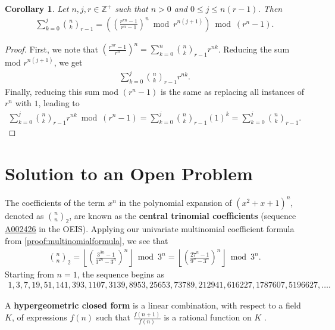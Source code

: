 \documentclass[10pt,a4paper]{article}
\theoremstyle{plain}
\newtheorem{corollary}{Corollary}[section]
\newcommand{\floor}[1]{\left\lfloor #1 \right\rfloor}
\newcommand{\seqnum}[1]{\href{https://oeis.org/#1}{\rm \underline{#1}}}
\begin{document}
\begin{corollary} \label{proof:multinomialcoeffpartialsums}
Let $n,j,r \in \mathbb{Z}^+$ such that $n > 0$ and $0 \leq j \leq n (r-1)$. Then
\begin{align*}
\sum_{k=0}^{j} \binom{n}{k}_{r-1}
= \left( \left( \frac{r^{rn}-1}{r^n-1} \right)^n \bmod r^{n(j+1)} \right) \bmod (r^n-1) .
\end{align*}
\end{corollary}
\begin{proof}
First, we note that $\left(\frac{r^{nr}-1}{r^n}\right)^n = \sum_{k=0}^n \binom{n}{k}_{r-1} r^{nk}$. Reducing the sum mod $r^{n(j+1)}$, we get
\begin{align*}
    \sum_{k=0}^{j} \binom{n}{k}_{r-1} r^{nk} .
\end{align*}
Finally, reducing this sum mod $(r^n-1)$ is the same as replacing all instances of $r^n$ with $1$, leading to
\begin{align*}
    \sum_{k=0}^{j} \binom{n}{k}_{r-1} r^{nk} \bmod (r^n-1)
    = \sum_{k=0}^{j} \binom{n}{k}_{r-1} (1)^{k}
    = \sum_{k=0}^{j} \binom{n}{k}_{r-1} .
\end{align*}
\end{proof}

\section{Solution to an Open Problem} \label{section:centraltrinomialcoefficients}
The coefficients of the term $x^n$ in the polynomial expansion of $(x^2+x+1)^n$, denoted as $\binom{n}{n}_2$, are known as the \textbf{central trinomial coefficients} (sequence \seqnum{A002426} in the OEIS). Applying our univariate multinomial coefficient formula from \cref{proof:multinomialformula}, we see that
\begin{align*}
    \binom{n}{n}_2 = \floor{\left(\frac{3^{3n} - 1}{3^{2n} - 3^n}\right)^n} \bmod 3^n
    = \floor{\left(\frac{27^n - 1}{9^n - 3^n}\right)^n} \bmod 3^n .
\end{align*}
Starting from $n=1$, the sequence begins as
\begin{align*}
1,3,7,19,51,141,393,1107,3139,8953,25653,73789,212941,616227,1787607,5196627, \ldots .
\end{align*}

A \textbf{hypergeometric closed form} is a linear combination, with respect to a field $K$, of expressions $f(n)$ such that $\frac{f(n+1)}{f(n)}$ is a rational function on $K$ \cite{petkovsek1996ab, sauras2018thesis}.
\end{document}
